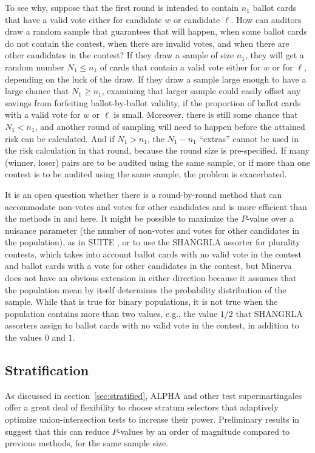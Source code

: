 \documentclass[aoas]{imsart}
\begin{document}
To see why, suppose that the first round is intended to contain $n_1$ ballot cards that have a valid vote either
for candidate $w$ or candidate $\ell$.  
How can auditors draw a random sample that guarantees that will happen, when some ballot cards do not contain
the contest, when there are invalid votes, and when there are other candidates in the contest?
If they draw a sample of size $n_1$, they will get a random number $N_1 \le n_1$ of cards that contain a valid vote either
for $w$ or for $\ell$, depending on the luck of the draw.
If they draw a sample large enough to have a large chance that $N_1 \ge n_1$, examining that larger sample could easily 
offset any savings from forfeiting ballot-by-ballot validity, if the proportion of ballot cards with a valid vote for $w$ or $\ell$ is
small.
Moreover, there is still some chance that $N_1 < n_1$, and another round of sampling will need to happen before the attained risk can be calculated.
And if $N_1 > n_1$, the $N_1-n_1$ ``extras'' cannot be used in the risk calculation in that round, because the round size is pre-specified.
If many (winner, loser) pairs are to be audited using the same sample, or if more than one contest is to be audited
using the same sample, the problem is exacerbated.

It is an open question whether there is a round-by-round method that can accommodate non-votes and votes
for other candidates and is more efficient than the methods in \citet{waudby-smithEtal21,stark20} and here.
It might be possible to maximize the $P$-value over a nuisance parameter (the number of non-votes and votes
for other candidates in the population), as in SUITE \citep{ottoboniEtal18}, or to use the SHANGRLA assorter
for plurality contests, which takes into account ballot cards with no valid vote in the contest and ballot cards with
a vote for other candidates in the contest, but Minerva does not have an obvious extension in either direction
because it assumes that the population mean by itself determines the probability distribution of
the sample.
While that is true for binary populations, it is not true when the population contains more than two values, e.g., the value $1/2$ that
SHANGRLA assorters assign to ballot cards with no valid vote in the contest, in addition to the values $0$ and $1$.

\subsection{Stratification}
As discussed in section~\ref{sec:stratified}, ALPHA and other test supermartingales offer a great deal of flexibility to
choose stratum selectors that
adaptively optimize union-intersection tests to increase their power.
Preliminary results in \cite{spertusStark22} suggest that this can reduce $P$-values by an order of magnitude
compared to previous methods, for the same sample size.
\end{document}
